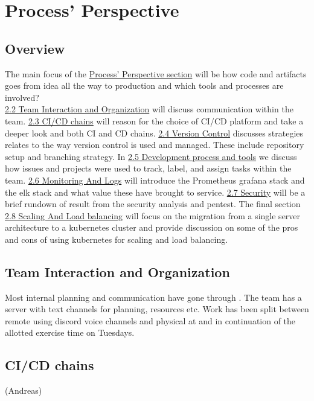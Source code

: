 \section{Process' Perspective}
\label{sec:processPerspective}

\subsection{Overview}
\label{subsec:overview}
The main focus of the \hyperref[sec:processPerspective]{Process' Perspective section} will be how code and artifacts goes from idea all the way to production and which tools and processes are involved?\\
\hyperref[subsec:TeamInteraction]{2.2 Team Interaction and Organization} will discuss communication within the team. \hyperref[subsec:cicd]{2.3 CI/CD chains} will reason for the choice of CI/CD platform and take a deeper look and both CI and CD chains.
\hyperref[subsec:vs]{2.4 Version Control} discusses strategies relates to the way version control is used and managed. These include repository setup and branching strategy. In 
\hyperref[subsec:process&tools]{2.5 Development process and tools} we discuss how issues and projects were used to track, label, and assign tasks within the team.
\hyperref[subsec:monitoring]{2.6 Monitoring And Logs} will introduce the Prometheus grafana stack and the elk stack and what value these have brought to service.
\hyperref[subsec:security]{2.7 Security} will be a brief rundown of result from the security analysis and pentest.
The final section \hyperref[subsec:scaling]{2.8 Scaling And Load balancing} will focus on the migration from a single server architecture to a kubernetes cluster and provide discussion on some of the pros and cons of using kubernetes for scaling and load balancing.

\subsection{Team Interaction and Organization}
\label{subsec:TeamInteraction}
Most internal planning and communication have gone through \cite{Discord}. The team has a server with text channels for planning, resources etc. Work has been split between remote using discord voice channels and physical at and in continuation of the allotted exercise time on Tuesdays.
\subsection{CI/CD chains} (Andreas)
\label{subsec:cicd}

